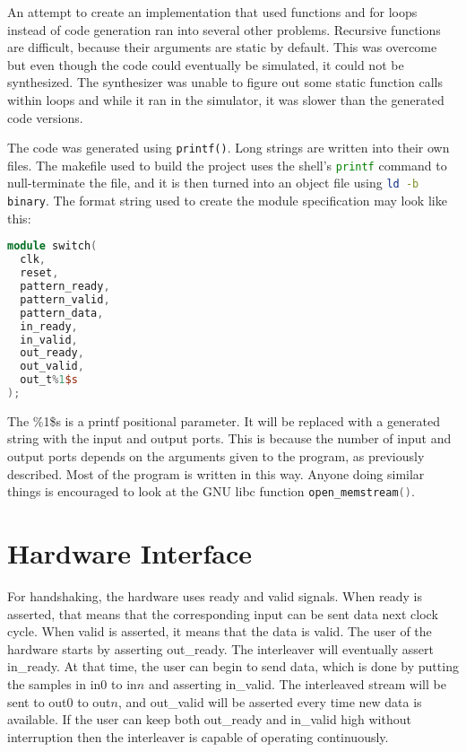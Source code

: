 \documentclass[
	utf8,
	largesmallcaps,
	intlimits,
	widermath,
	sharecounter,
	nobreak,
	definition=marks,
	numbers,
	noparts
]{rtthesis}
\begin{document}
An attempt to create an implementation that used functions and for loops
instead of code generation ran into several other problems. Recursive functions
are difficult, because their arguments are static by default. This was overcome
but even though the code could eventually be simulated, it could not be
synthesized. The synthesizer was unable to figure out some static function calls
within loops and while it ran in the simulator, it was slower than the generated
code versions.

The code was generated using \lstinline{printf()}. Long strings are written
into their own files. The makefile used to build the project uses the shell's
\lstinline[language=sh]{printf} command to null-terminate the file, and it is
then turned into an object file using \lstinline[language=sh]{ld -b binary}.
The format string used to create the module specification may look like this:

\begin{lstlisting}[language=Verilog]
module switch(
  clk,
  reset,
  pattern_ready,
  pattern_valid,
  pattern_data,
  in_ready,
  in_valid,
  out_ready,
  out_valid,
  out_t%1$s
);
\end{lstlisting}

The \%1\$s is a printf positional parameter. It will be replaced with
a generated string with the input and output ports. This is because the number
of input and output ports depends on the arguments given to the program, as
previously described. Most of the program is written in this way. Anyone doing
similar things is encouraged to look at the GNU libc function
\lstinline[language=C]{open_memstream()}.

\section{Hardware Interface}

For handshaking, the hardware uses ready and valid signals. When ready is
asserted, that means that the corresponding input can be sent data next clock
cycle. When valid is asserted, it means that the data is valid. The user of the
hardware starts by asserting out\_ready. The interleaver will eventually assert
in\_ready. At that time, the user can begin to send data, which is done by
putting the samples in in0 to in$n$ and asserting in\_valid. The interleaved
stream will be sent to out0 to out$n$, and out\_valid will be asserted every
time new data is available. If the user can keep both out\_ready and in\_valid
high without interruption then the interleaver is capable of operating
continuously.
\end{document}
